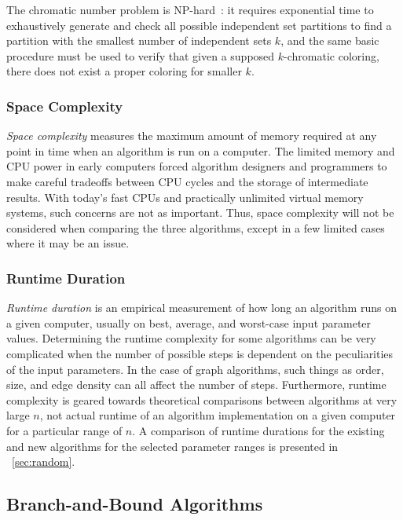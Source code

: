 The chromatic number problem is NP-hard~\cite{mcdiarmid}: it requires exponential time to exhaustively generate and
check all possible independent set partitions to find a partition with the smallest number of independent sets
\(k\), and the same basic procedure must be used to verify that given a supposed \(k\)-chromatic coloring, there
does not exist a proper coloring for smaller \(k\).

\subsubsection{Space Complexity}\label{sec:sub:sub:space}

\emph{Space complexity} measures the maximum amount of memory required at any point in time when an algorithm is
run on a computer.  The limited memory and CPU power in early computers forced algorithm designers and programmers
to make careful tradeoffs between CPU cycles and the storage of intermediate results.  With today's fast CPUs and
practically unlimited virtual memory systems, such concerns are not as important.  Thus, space complexity will not
be considered when comparing the three algorithms, except in a few limited cases where it may be an issue.

\subsubsection{Runtime Duration}\label{sec:sub:sub:duration}

\emph{Runtime duration} is an empirical measurement of how long an algorithm runs on a given computer, usually on
best, average, and worst-case input parameter values.  Determining the runtime complexity for some algorithms can
be very complicated when the number of possible steps is dependent on the peculiarities of the input parameters.
In the case of graph algorithms, such things as order, size, and edge density can all affect the number of steps.
Furthermore, runtime complexity is geared towards theoretical comparisons between algorithms at very large \(n\),
not actual runtime of an algorithm implementation on a given computer for a particular range of \(n\).  A
comparison of runtime durations for the existing and new algorithms for the selected parameter ranges is presented
in \sectionname~\ref{sec:random}.

\subsection{Branch-and-Bound Algorithms}\label{sec:sub:bandb}

